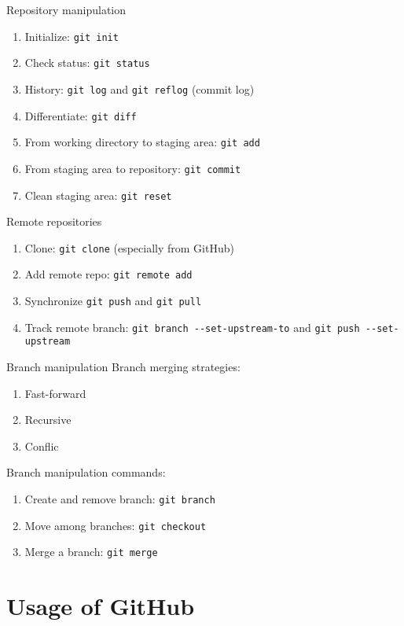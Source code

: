 \documentclass[english, nochinese]{pkuslide}
\begin{document}
\begin{frame}[fragile]{Repository manipulation}
\begin{enumerate}
\item Initialize: \verb"git init"
\item Check status: \verb"git status"
\item History: \verb"git log" and \verb"git reflog" (commit log)
\item Differentiate: \verb"git diff"
\item From working directory to staging area: \verb"git add"
\item From staging area to repository: \verb"git commit"
\item Clean staging area: \verb"git reset"
\end{enumerate}
\end{frame}

\begin{frame}[fragile]{Remote repositories}
\begin{enumerate}
\item Clone: \verb"git clone" (especially from GitHub)
\item Add remote repo: \verb"git remote add"
\item Synchronize \verb"git push" and \verb"git pull"
\item Track remote branch: \verb"git branch --set-upstream-to" and \verb"git push --set-upstream"
\end{enumerate}
\end{frame}

\begin{frame}[fragile]{Branch manipulation}
Branch merging strategies:
\begin{enumerate}
\item Fast-forward
\item Recursive
\item Conflic
\end{enumerate}

Branch manipulation commands:
\begin{enumerate}
\item Create and remove branch: \verb"git branch"
\item Move among branches: \verb"git checkout"
\item Merge a branch: \verb"git merge"
\end{enumerate}
\end{frame}

\section{Usage of GitHub}
\end{document}
